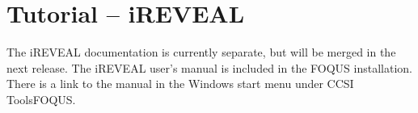 \section{Tutorial -- iREVEAL} 
The iREVEAL documentation is currently separate, but will be merged in the next release. The iREVEAL user's manual is included in the FOQUS installation.  There is a link to the manual in the Windows start menu under CCSI Tools\bs FOQUS.
